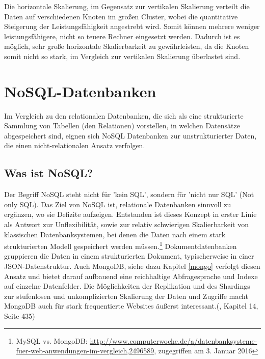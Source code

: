 Die horizontale Skalierung, im Gegensatz zur vertikalen Skalierung verteilt die Daten auf verschiedenen Knoten im großen Cluster, wobei die quantitative Steigerung der Leistungsfähigkeit angestrebt wird. Somit können mehrere weniger leistungsfähigere, nicht so teuere Rechner eingesetzt werden. Dadurch ist es möglich, sehr große horizontale Skalierbarkeit zu gewährleisten, da die Knoten somit nicht so stark, im Vergleich zur vertikalen Skalierung überlastet sind. 

\section{NoSQL-Datenbanken}
Im Vergleich zu den relationalen Datenbanken, die sich als eine strukturierte Sammlung von Tabellen (den Relationen) vorstellen, in welchen Datensätze abgespeichert sind, eignen sich NoSQL Datenbanken zur unstrukturierter Daten, die einen nicht-relationalen Ansatz verfolgen. 


\subsection{Was ist NoSQL?}
Der Begriff NoSQL steht nicht für 'kein SQL', sondern für 'nicht nur SQL' (Not only SQL). Das Ziel von NoSQL ist, relationale Datenbanken sinnvoll zu ergänzen, wo sie Defizite aufzeigen. Entstanden ist dieses Konzept in erster Linie als Antwort zur Unflexibilität, sowie zur relativ schwierigen Skalierbarkeit von klassischen Datenbanksystemen, bei denen die Daten nach einem stark strukturierten Modell gespeichert werden müssen.\footnote{MySQL vs. MongoDB: \url{http://www.computerwoche.de/a/datenbanksysteme-fuer-web-anwendungen-im-vergleich,2496589}, zugegriffen am 3. Januar 2016} Dokumentdatenbanken gruppieren die Daten in einem strukturierten Dokument, typischerweise in einer JSON-Datenstruktur. Auch MongoDB, siehe dazu Kapitel \ref{mongo} verfolgt diesen Ansatz und bietet darauf aufbauend eine reichhaltige Abfragesprache und Indexe auf einzelne Datenfelder. Die Möglichkeiten der Replikation und des Shardings zur stufenlosen und unkomplizierten Skalierung der Daten und Zugriffe macht MongoDB auch für stark frequentierte Websites äußerst interessant.(\cite{Hollosi.2012}, Kapitel 14, Seite 435)

